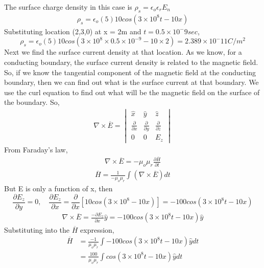\begin{exmp}
The surface charge density in this case is $\rho_s = \epsilon_o\epsilon_rE_n$
\begin{align*}
\rho_s = \epsilon_o(5)10cos(3\times10^8t - 10x)
\end{align*}
Substituting location (2,3,0) at x = 2m and $t = 0.5\times 10^-9sec$,
\begin{dmath*}
\rho_s = \epsilon_o(5)10cos(3\times 10^8\times 0.5\times10^{-9} - 10\times 2) = 2.389\times 10^-11 C/m^2
\end{dmath*}
Next we find the surface current density at that location. As we know, for a conducting boundary, the surface current density is related to the magnetic field. \\
So, if we know the tangential component of the magnetic field at the conducting boundary, then we can find out what is the surface current at that boundary. We use the curl equation to find out what will be the magnetic field on the surface of the boundary. So,
\begin{align*}
\nabla\times \overline{E} = \begin{vmatrix}
\hat{x} &\hat{y} &\hat{z}\\
\frac{\partial}{\partial x} & \frac{\partial}{\partial y} & \frac{\partial}{\partial z} \\
0 &0 &E_z
\end{vmatrix}
\end{align*}
From Faraday's law,
\begin{align*}
\nabla\times\overline{E} = -\mu_o\mu_r\frac{\partial\overline{H}}{\partial t}
\end{align*}
\begin{align*}
\overline{H} = \frac{1}{-\mu_o\mu_r}\int (\nabla\times\overline{E})dt
\end{align*}
But E is only a function of x, then
\begin{dmath*}
\frac{\partial E_z}{\partial y} = 0,\quad \frac{\partial E_z}{\partial x} = \frac{\partial}{\partial x}\left[ 10cos(3\times 10^8 - 10x) \right] = -100cos(3\times 10^8 t - 10x)
\end{dmath*}
\begin{align*}
\nabla\times\overline{E} = \frac{-\partial E_z}{\partial x}\hat{y} = -100cos(3\times10^8t - 10x)\hat{y}
\end{align*}
Substituting into the $\overline{H}$ expression,
\begin{align*}
\overline{H} &= \frac{-1}{\mu_o\mu_r}\int-100cos(3\times 10^8t - 10x)\hat{y}dt \\
&=\frac{100}{\mu_o\mu_r}\int cos(3\times 10^8t - 10x)\hat{y}dt \\

\end{align*}
\end{exmp}
